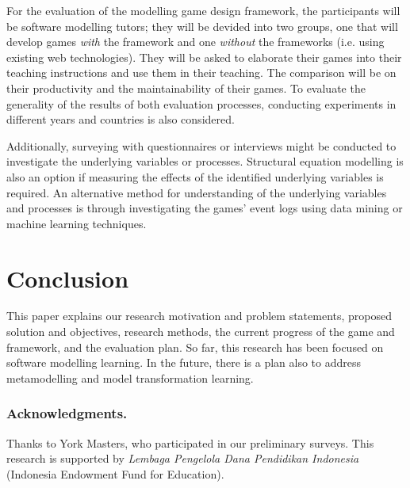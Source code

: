 \documentclass[runningheads,a4paper]{llncs}
\begin{document}
For the evaluation of the modelling game design framework, the participants will be software modelling tutors; they will be devided into two groups, one that will develop games \emph{with} the framework and one \emph{without} the frameworks (i.e. using existing web technologies). They will be asked to elaborate their games into their teaching instructions and use them in their teaching. The comparison will be on their productivity and the maintainability of their games. To evaluate the generality of the results of both evaluation processes, conducting experiments in different years and countries is also considered.

Additionally, surveying with questionnaires or interviews might be conducted to investigate the underlying variables or processes. Structural equation modelling \cite{hair2016primer} is also an option if measuring the effects of the identified underlying variables is required. An alternative method for understanding of the underlying variables and processes is through investigating the games' event logs using data mining or machine learning techniques.

\section{Conclusion}
This paper explains our research motivation and problem statements, proposed solution and objectives, research methods, the current progress of the game and framework, and the evaluation plan. So far, this research has been focused on software modelling learning. In the future, there is a plan also to address metamodelling and model transformation learning. 

\subsubsection*{Acknowledgments.} Thanks to York Masters, who participated in our preliminary surveys. This research is supported by \emph{Lembaga Pengelola Dana Pendidikan Indonesia} (Indonesia Endowment Fund for Education). 

 

\end{document}
